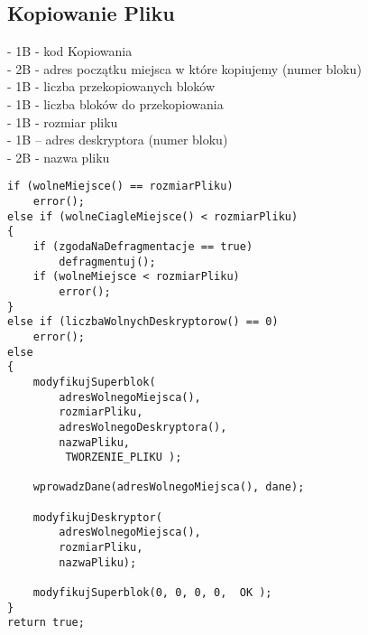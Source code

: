 \documentclass[paper=a4, fontsize=11pt]{scrartcl} %
\numberwithin{equation}{section} %
\numberwithin{figure}{section} %
\numberwithin{table}{section} %
\begin{document}
\subsection{Kopiowanie Pliku}
- 1B - kod Kopiowania\\
- 2B - adres początku miejsca w które kopiujemy (numer bloku)\\
- 1B - liczba przekopiowanych bloków\\
- 1B - liczba bloków do przekopiowania\\
- 1B - rozmiar pliku\\
- 1B – adres deskryptora (numer bloku)\\
- 2B - nazwa pliku\\
\begin{samepage}
\begin{lstlisting}
if (wolneMiejsce() == rozmiarPliku)  
	error(); 
else if (wolneCiagleMiejsce() < rozmiarPliku)
{   
    if (zgodaNaDefragmentacje == true) 
		defragmentuj();  
    if (wolneMiejsce < rozmiarPliku)  
		error(); 
} 
else if (liczbaWolnychDeskryptorow() == 0)  
	error(); 
else 
{
    modyfikujSuperblok( 
        adresWolnegoMiejsca(),  
        rozmiarPliku,  
        adresWolnegoDeskryptora(),  
        nazwaPliku,  
         TWORZENIE_PLIKU ); 
 
    wprowadzDane(adresWolnegoMiejsca(), dane); 
 
    modyfikujDeskryptor( 
        adresWolnegoMiejsca(),  
        rozmiarPliku,  
        nazwaPliku); 
 
    modyfikujSuperblok(0, 0, 0, 0,  OK ); 
} 
return true;    
\end{lstlisting}
\end{samepage}
\end{document}
